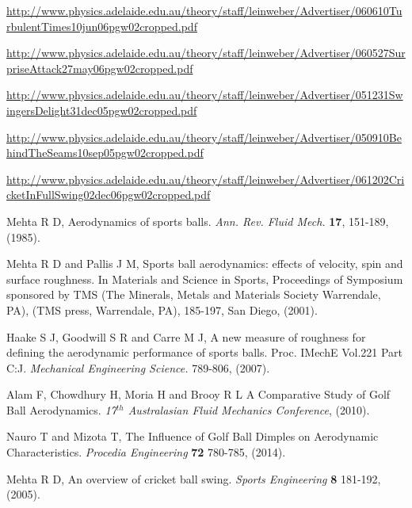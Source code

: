 \documentclass[a4paper]{article}
\begin{document}
\begin{thebibliography}{99}

				\url{http://www.physics.adelaide.edu.au/theory/staff/leinweber/Advertiser/060610TurbulentTimes10jun06pgw02cropped.pdf}

\url{http://www.physics.adelaide.edu.au/theory/staff/leinweber/Advertiser/060527SurpriseAttack27may06pgw02cropped.pdf}

\url{http://www.physics.adelaide.edu.au/theory/staff/leinweber/Advertiser/051231SwingersDelight31dec05pgw02cropped.pdf}

\url{http://www.physics.adelaide.edu.au/theory/staff/leinweber/Advertiser/050910BehindTheSeams10sep05pgw02cropped.pdf}

\url{http://www.physics.adelaide.edu.au/theory/staff/leinweber/Advertiser/061202CricketInFullSwing02dec06pgw02cropped.pdf}

	Mehta R D, Aerodynamics of sports balls. \textit{Ann. Rev. Fluid Mech.} \textbf{17}, 151-189, (1985).

	Mehta R D and Pallis J M, Sports ball aerodynamics: effects of velocity, spin and surface roughness. In Materials and Science in Sports, Proceedings of Symposium sponsored by TMS (The Minerals, Metals and Materials Society 			Warrendale, PA), (TMS press, Warrendale, PA), 185-197, San Diego, (2001).

	Haake S J, Goodwill S R and Carre M J, A new measure of roughness for defining the aerodynamic performance of sports balls. Proc. IMechE Vol.221 Part C:J. \textit{Mechanical Engineering Science.} 789-806, (2007).

	Alam F, Chowdhury H, Moria H and Brooy R L A Comparative Study of Golf Ball Aerodynamics. \textit{17$^{th}$ Australasian Fluid Mechanics Conference}, (2010).

	Nauro T and Mizota T, The Influence of Golf Ball Dimples on Aerodynamic Characteristics. \textit{Procedia Engineering} \textbf{72} 780-785, (2014).

	Mehta R D, An overview of cricket ball swing. \textit{Sports Engineering} \textbf{8} 181-192, (2005).


\end{thebibliography}
\end{document}
